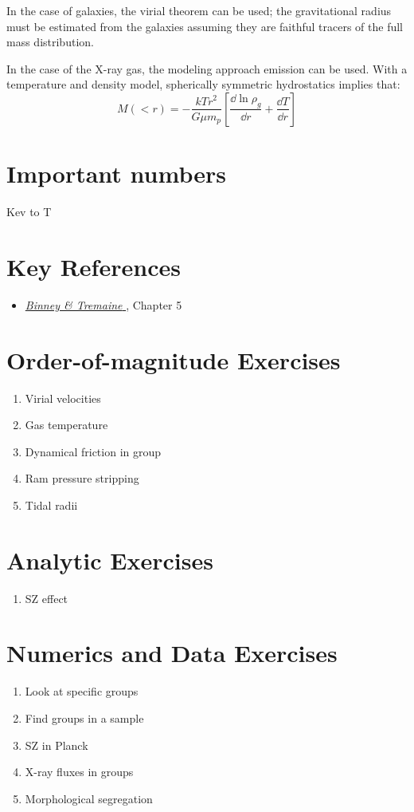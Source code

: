 In the case of galaxies, the virial theorem can be used; the
gravitational radius must be estimated from the galaxies assuming they
are faithful tracers of the full mass distribution.

In the case of the X-ray gas, the modeling approach emission can be
used. With a temperature and density model, spherically symmetric
hydrostatics implies that:
\begin{equation}
M(<r) = - \frac{kTr^2}{G\mu m_p} \left[\frac{\dd \ln \rho_g}{\dd r}
+ \frac{\dd T}{\dd r}\right]
\end{equation}

\section{Important numbers}

Kev to T

\section{Key References}

\begin{itemize}
  \item
    \href{http://adsabs.harvard.edu/abs/2000asqu.book.....C}{
    {\it Binney \& Tremaine}
      \citet{cox00a}}, Chapter 5
\end{itemize}

\section{Order-of-magnitude Exercises}

\begin{enumerate} 
\item Virial velocities
\item Gas temperature
\item Dynamical friction in group
\item Ram pressure stripping
\item Tidal radii
\end{enumerate}   

\section{Analytic Exercises}

\begin{enumerate}
\item SZ effect
\end{enumerate}

\section{Numerics and Data Exercises}

\begin{enumerate}
\item Look at specific groups
\item Find groups in a sample
\item SZ in Planck
\item X-ray fluxes in groups
\item Morphological segregation
\end{enumerate}


  
